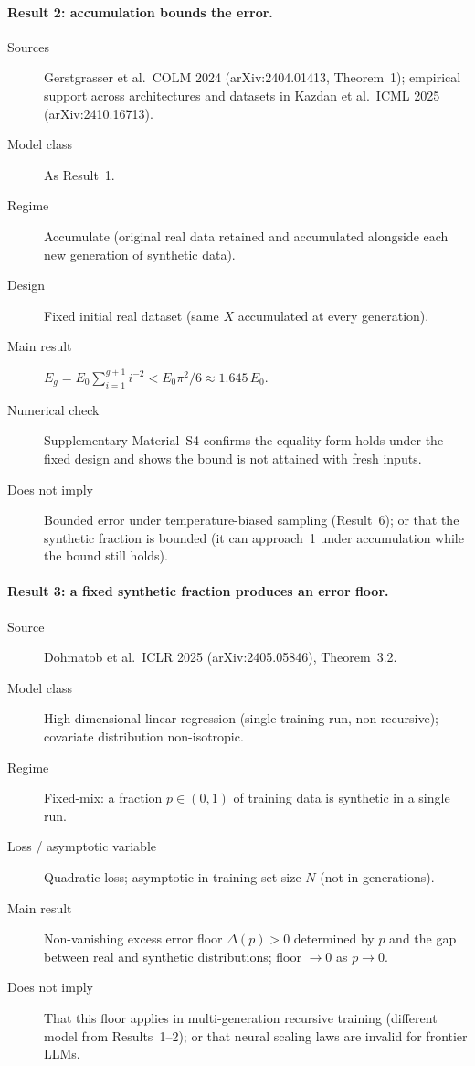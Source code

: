 \paragraph{Result 2: accumulation bounds the error.}
\begin{description}
\item[Sources]
  Gerstgrasser et al.\ COLM 2024 (arXiv:2404.01413, Theorem~1); empirical
  support across architectures and datasets in Kazdan et al.\ ICML 2025
  (arXiv:2410.16713).
\item[Model class] As Result~1.
\item[Regime] Accumulate (original real data retained and accumulated alongside each
  new generation of synthetic data).
\item[Design] Fixed initial real dataset (same $X$ accumulated at every generation).
\item[Main result]
  $E_g = E_0 \sum_{i=1}^{g+1} i^{-2} < E_0 \pi^2/6 \approx 1.645\,E_0$.
\item[Numerical check] Supplementary Material~S4 confirms the equality form holds
  under the fixed design and shows the bound is not attained with fresh inputs.
\item[Does not imply] Bounded error under temperature-biased sampling (Result~6);
  or that the synthetic fraction is bounded (it can approach~1 under accumulation
  while the bound still holds).
\end{description}

\paragraph{Result 3: a fixed synthetic fraction produces an error floor.}
\begin{description}
\item[Source] Dohmatob et al.\ ICLR 2025 (arXiv:2405.05846), Theorem~3.2.
\item[Model class] High-dimensional linear regression (single training run,
  non-recursive); covariate distribution non-isotropic.
\item[Regime] Fixed-mix: a fraction $p \in (0,1)$ of training data is synthetic in
  a single run.
\item[Loss / asymptotic variable] Quadratic loss; asymptotic in training set size
  $N$ (not in generations).
\item[Main result] Non-vanishing excess error floor
  $\Delta(p) > 0$ determined by $p$ and the gap between real and synthetic
  distributions; floor $\to 0$ as $p \to 0$.
\item[Does not imply] That this floor applies in multi-generation recursive training
  (different model from Results~1--2); or that neural scaling laws are invalid for
  frontier LLMs.
\end{description}

